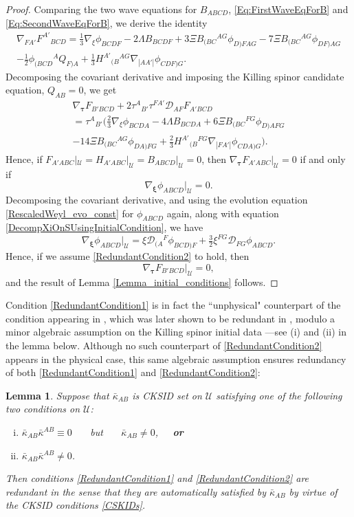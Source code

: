 \documentclass[10pt,a4paper]{article}
\theoremstyle{plain}
\newtheorem{lemma}{Lemma}
\begin{document}
\begin{proof}
\medskip
Comparing the two wave equations for $B_{ABCD}$,
\eqref{Eq:FirstWaveEqForB} and \eqref{Eq:SecondWaveEqForB}, we derive
the identity
\begin{multline}
     \nabla_{FA'}F^{A'}{}_{BCD} = \tfrac{1}{3}
     \nabla_{\xi}{}\phi_{BCDF} - 2 \Lambda B_{BCDF} + 3\Xi
     B_{(BC}{}^{AG} \phi_{D)FAG} - 7 \Xi B_{(BC}{}^{AG}\phi_{DF)AG}
     \\- \tfrac{1}{2} \phi_{(BCD}{}^{A}Q_{F)A} + \tfrac{1}{3}
     H^{A'}{}_{(B}{}^{AG}\nabla_{|AA'|}\phi_{CDF)G}\label{CurlOfFInTermsOfCollineation}.
\end{multline}
Decomposing the covariant derivative and imposing the Killing spinor
candidate equation, $Q_{AB}=0$, we get
\begin{multline}
\nabla_{\bm\tau} F_{B'BCD} + 2 \tau^{A}{}_{B'} \tau^{FA'}
\mathcal{D}_{AF}F_{A'BCD} \\ = \tau^{A}{}_{B'} \big(\tfrac{2}{3}
\nabla_{\xi}\phi_{BCDA} - 4 \Lambda B_{BCDA} + 6 \Xi B_{(BC}{}^{FG}
\phi_{D)AFG} \\ - 14 \Xi B_{(BC}{}^{AG}\phi_{DA)FG} + \tfrac{2}{3}
H^{A'}{}_{(B}{}^{FG}\nabla_{|FA'|}\phi_{CDA)G} \big).
\end{multline}
Hence, if
$F_{A'ABC}|_{\mathcal{U}}=H_{A'ABC}|_{\mathcal{U}}=B_{ABCD}|_{\mathcal{U}}=0$,
then $\nabla_{\bm\tau}F_{A'ABC}|_{\mathcal{U}}=0$ if and only if
\[ \nabla_{\bm\xi}\phi_{ABCD}|_{\mathcal{U}}=0.\]
Decomposing the covariant derivative, and using the evolution equation
\eqref{RescaledWeyl_evo_const} for $\phi_{ABCD}$ again, along with
equation \eqref{DecompXiOnSUsingInitialCondition}, we have
\[ \nabla_{\bm\xi}\phi_{ABCD}|_{\mathcal{U}} =  \xi \mathcal{D}_{(A}{}^{F}\phi_{BCD)F} + \tfrac{3}{2} \xi^{FG} \mathcal{D}_{FG}\phi_{ABCD}. \]
Hence, if we assume \eqref{RedundantCondition2} to hold, then
\[\nabla_{\bm\tau} F_{B'BCD}|_{\mathcal{U}}=0, \]
and the result of Lemma \ref{Lemma_initial_conditions} follows.
\end{proof}
Condition \eqref{RedundantCondition1} is in fact the ``unphysical"
counterpart of the condition appearing in \cite{GarVal08c}, which was
later shown to be redundant in \cite{BaeVal10c}, modulo a minor
algebraic assumption on the Killing spinor initial data ---see (i) and
(ii) in the lemma below. Although no such counterpart of
\eqref{RedundantCondition2} appears in the physical case, this same
algebraic assumption ensures redundancy of both
\eqref{RedundantCondition1} and \eqref{RedundantCondition2}:
\begin{lemma}\label{prop_remove_redundant_conditions}
Suppose that $\bar{\kappa}_{AB}$ is CKSID set on $\mathcal{U}$
satisfying one of the following two conditions on $\mathcal{U}$:
\begin{enumerate}[(i)]
    \item $\bar{\kappa}_{AB}\bar{\kappa}^{AB} \equiv 0$ ~~~but
      ~~~$\bar{\kappa}_{AB}\neq 0$,~~~\textbf{\textit{or}}
    \item $\bar{\kappa}_{AB}\bar{\kappa}^{AB}\neq 0$.
\end{enumerate}
Then
conditions \eqref{RedundantCondition1} and \eqref{RedundantCondition2}
are redundant in the sense that they are automatically satisfied by
$\bar{\kappa}_{AB}$ by virtue of the CKSID conditions \eqref{CSKIDs}. 
\end{lemma}
\end{document}
